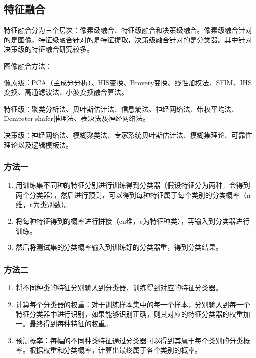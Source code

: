 \subsection{特征融合}
特征融合分为三个层次：像素级融合、特征级融合和决策级融合。像素级融合针对的是图像，特征级融合针对的是特征提取，决策级融合针对的是分类器。其中针对决策级的特征融合研究较多。

图像融合方法：

像素级：PCA（主成分分析）、HIS变换、Brovery变换、线性加权法、SFIM、IHS变换、高通滤波法、小波变换融合算法。

特征级：聚类分析法、贝叶斯估计法、信息熵法、神经网络法、带权平均法、Dempster-shafer推理法、表决法及神经网络法。

决策级：神经网络法、模糊聚类法、专家系统贝叶斯估计法、模糊集理论、可靠性理论以及逻辑模板法。


\subsubsection{方法一}
\begin{enumerate}
\item 用训练集不同种的特征分别进行训练得到分类器（假设特征分为两种，会得到两个分类器），然后进行预测，可以得到每种特征属于每个类别的分类概率（n维，n为类别数）。
\item 将每种特征得到的概率进行拼接（cn维，c为特征种类），再输入到分类器进行训练。
\item 然后将测试集的分类概率输入到训练好的分类器重，得到分类结果。
\end{enumerate}

\subsubsection{方法二}
\begin{enumerate}
\item 将不同种类的特征分别输入到分类器，训练得到对应的特征分类器。
\item 计算每个分类器的权重：对于训练样本集中的每一个样本，分别输入到每一个特征分类器中进行识别，如果能够识别正确，则其对应的特征分类器的权重加一。最终得到每种特征的权重。
\item 预测概率：每幅的不同种类特征通过分类器可以得到其属于每个类别的分类概率。根据权重和分类概率，计算出最终属于各个类别的概率。
\end{enumerate}



\begin{comment}
\begin{itemize}
\item 基于灰度共生矩阵的方法
\item 灰度-梯度共生矩阵分析法
\item 灰度行程长度统计法
\item 小波分析法
\item 基于Gabor小波变换的纹理分析法
\end{itemize}
\end{comment}